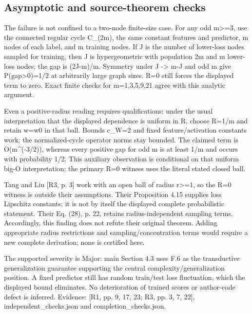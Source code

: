 \documentclass[10pt]{article}
\begin{document}
\subsection*{Asymptotic and source-theorem checks}
The failure is not confined to a two-node finite-size case. For any odd m>=3, use the connected regular cycle C\_(2m), the same constant features and predictor, m nodes of each label, and m training nodes. If J is the number of lower-loss nodes sampled for training, then J is hypergeometric with population 2m and m lower-loss nodes; the gap is (2J-m)/m. Symmetry under J -> m-J and odd m give P(gap>0)=1/2 at arbitrarily large graph sizes. R=0 still forces the displayed term to zero. Exact finite checks for m=1,3,5,9,21 agree with this analytic argument.\par
Even a positive-radius reading requires qualifications: under the usual interpretation that the displayed dependence is uniform in R, choose R=1/m and retain w=w0 in that ball. Bounds c\_W=2 and fixed feature/activation constants work; the normalized-cycle operator norms stay bounded. The claimed term is O(m\textasciicircum{}(-3/2)), whereas every positive gap for odd m is at least 1/m and occurs with probability 1/2. This auxiliary observation is conditional on that uniform big-O interpretation; the primary R=0 witness uses the literal stated closed ball.\par
Tang and Liu [R3, p. 3] work with an open ball of radius r>=1, so the R=0 witness is outside their assumptions. Their Proposition 4.15 supplies loss Lipschitz constants; it is not by itself the displayed complete probabilistic statement. Their Eq. (28), p. 22, retains radius-independent sampling terms. Accordingly, this finding does not refute their original theorem. Adding appropriate radius restrictions and sampling/concentration terms would require a new complete derivation; none is certified here.\par
The supported severity is Major: main Section 4.3 uses F.6 as the transductive generalization guarantee supporting the central complexity/generalization position. A fixed predictor still has random train/test loss fluctuation, which the displayed bound eliminates. No deterioration of trained scores or author-code defect is inferred. Evidence: [R1, pp. 9, 17, 23; R3, pp. 3, 7, 22], independent\_checks.json and completion\_checks.json.\par
\end{document}

